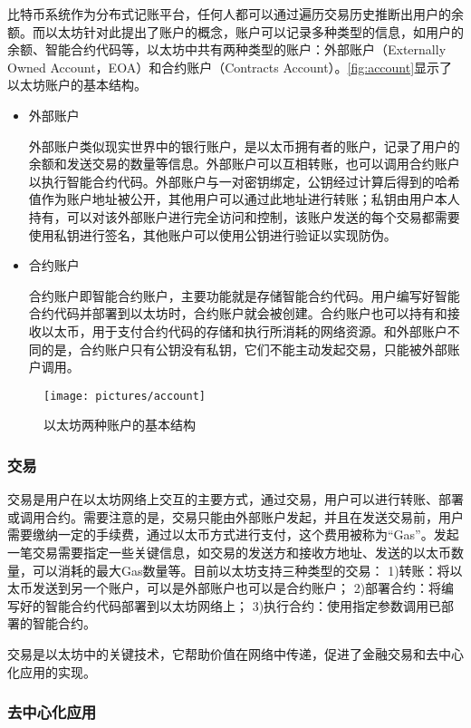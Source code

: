     比特币系统作为分布式记账平台，任何人都可以通过遍历交易历史推断出用户的余额。而以太坊针对此提出了账户的概念，账户可以记录多种类型的信息，如用户的余额、智能合约代码等，以太坊中共有两种类型的账户：外部账户（Externally Owned Account，EOA）和合约账户（Contracts Account）。\autoref{fig:account}显示了以太坊账户的基本结构。
    \begin{itemize}
        \item 外部账户
        
        外部账户类似现实世界中的银行账户，是以太币拥有者的账户，记录了用户的余额和发送交易的数量等信息。外部账户可以互相转账，也可以调用合约账户以执行智能合约代码。外部账户与一对密钥绑定，公钥经过计算后得到的哈希值作为账户地址被公开，其他用户可以通过此地址进行转账；私钥由用户本人持有，可以对该外部账户进行完全访问和控制，该账户发送的每个交易都需要使用私钥进行签名，其他账户可以使用公钥进行验证以实现防伪。
        \item 合约账户
        
        合约账户即智能合约账户，主要功能就是存储智能合约代码。用户编写好智能合约代码并部署到以太坊时，合约账户就会被创建。合约账户也可以持有和接收以太币，用于支付合约代码的存储和执行所消耗的网络资源。和外部账户不同的是，合约账户只有公钥没有私钥，它们不能主动发起交易，只能被外部账户调用。
        
    \end{itemize}
    \begin{figure}[htbp]
        \centering
        \texttt{[image: pictures/account]}
        \caption{\label{fig:account}以太坊两种账户的基本结构}
    \end{figure}
\subsubsection{交易}
    
    交易是用户在以太坊网络上交互的主要方式，通过交易，用户可以进行转账、部署或调用合约。需要注意的是，交易只能由外部账户发起，并且在发送交易前，用户需要缴纳一定的手续费，通过以太币方式进行支付，这个费用被称为“Gas”。发起一笔交易需要指定一些关键信息，如交易的发送方和接收方地址、发送的以太币数量，可以消耗的最大Gas数量等。目前以太坊支持三种类型的交易：
    1)转账：将以太币发送到另一个账户，可以是外部账户也可以是合约账户；
    2)部署合约：将编写好的智能合约代码部署到以太坊网络上；
    3)执行合约：使用指定参数调用已部署的智能合约。

    交易是以太坊中的关键技术，它帮助价值在网络中传递，促进了金融交易和去中心化应用的实现。
\subsubsection{去中心化应用}
    
